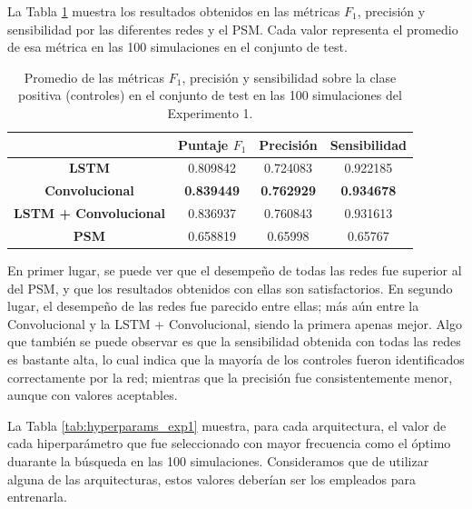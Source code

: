 \documentclass[../../main.tex]{subfiles}
\begin{document}
La Tabla \ref{tab:results_exp1} muestra los resultados obtenidos en las métricas \(F_1\),
precisión y sensibilidad por las diferentes redes y el PSM. Cada valor representa el
promedio de esa métrica en las 100 simulaciones en el conjunto de test.

\begin{table}[H]
    \centering
    \renewcommand{\arraystretch}{1.2}
    \begin{tabular}{|c|c|c|c|}
        \hline
         & \textbf{Puntaje} \(F_1\) & \textbf{Precisión} & \textbf{Sensibilidad} \\ \hline\hline
        \textbf{LSTM}
            & 0.809842 & 0.724083 & 0.922185 \\ \hline
        \textbf{Convolucional}
            & \textbf{0.839449} & \textbf{0.762929} & \textbf{0.934678} \\ \hline
        \textbf{LSTM + Convolucional}
            & 0.836937 & 0.760843 & 0.931613 \\ \hline
        \textbf{PSM}
            & 0.658819 & 0.65998 & 0.65767 \\
        \hline
    \end{tabular}
    \caption{Promedio de las métricas \(F_1\), precisión y sensibilidad sobre la
    clase positiva (controles) en el conjunto de test en las 100 simulaciones del
    Experimento 1.}
    \label{tab:results_exp1}
\end{table}

En primer lugar, se puede ver que el desempeño de todas las redes fue superior al del PSM,
y que los resultados obtenidos con ellas son satisfactorios. En segundo lugar, el
desempeño de las redes fue parecido entre ellas; más aún entre la Convolucional y la LSTM
+ Convolucional, siendo la primera apenas mejor. Algo que también se puede observar es que
la sensibilidad obtenida con todas las redes es bastante alta, lo cual indica que la
mayoría de los controles fueron identificados correctamente por la red; mientras que la
precisión fue consistentemente menor, aunque con valores aceptables.

La Tabla \ref{tab:hyperparams_exp1} muestra, para cada arquitectura, el valor de cada
hiperparámetro que fue seleccionado con mayor frecuencia como el óptimo duarante la
búsqueda en las 100 simulaciones. Consideramos que de utilizar alguna de las
arquitecturas, estos valores deberían ser los empleados para entrenarla.
\end{document}
